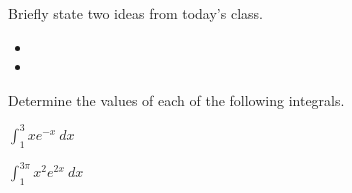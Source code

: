 \postClass

\begin{problem}
\item Briefly state two ideas from today's class.
  \begin{itemize}
  \item
  \item
  \end{itemize}
\item
  \begin{subproblem}
    \item
  \end{subproblem}
\end{problem}



\begin{problem}
\item Determine the values of each of the following integrals.
  \begin{subproblem}
  \item $\int^{3}_1 x e^{-x} ~ dx$
    \vfill
  \item $\int^{3\pi}_1 x^2 e^{2x} ~ dx$
    \vfill
  \end{subproblem}
\end{problem}



